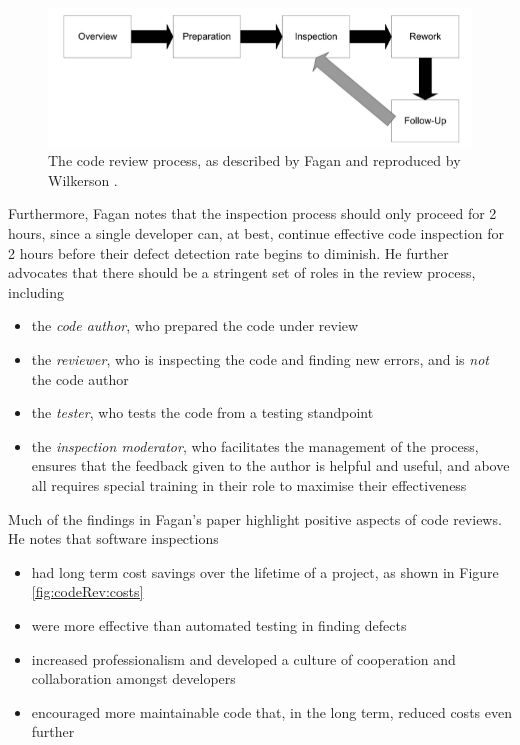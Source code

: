 \begin{figure}
\centering
\includegraphics{media/ComparingDefectReductionBenefits}
\caption{The code review process, as described by Fagan \cite{AdvancesInSoftwareInspection} and
reproduced by Wilkerson \cite{wilkerson2012comparing}.}
\label{fig:codeRev:process}
\end{figure}

Furthermore, Fagan \cite{AdvancesInSoftwareInspection} notes that the inspection process should only proceed for 2 hours, since a single developer
can, at best, continue effective code inspection for 2 hours before their defect detection rate
begins to diminish.
He further advocates that there should be a stringent set of roles in the review process, including
\begin{itemize}
	\item the {\em code author}, who prepared the code under review
	\item the {\em reviewer}, who is inspecting the code and finding new errors, and is {\it not} the
		code author
	\item the {\em tester}, who tests the code from a testing standpoint
	\item the {\em inspection moderator}, who facilitates the management of the process, ensures that
		the feedback given to the author is helpful and useful, and above all requires special training
		in their role to maximise their effectiveness
\end{itemize}

Much of the findings in Fagan's paper highlight positive aspects of code reviews.
He notes that software inspections
\begin{itemize}
	\item had long term cost savings over the lifetime of a project, as shown in Figure
		\ref{fig:codeRev:costs}
	\item were more effective than automated testing in finding defects
	\item increased professionalism and developed a culture of cooperation and collaboration amongst
		developers
	\item encouraged more maintainable code that, in the long term, reduced costs even further
\end{itemize}

